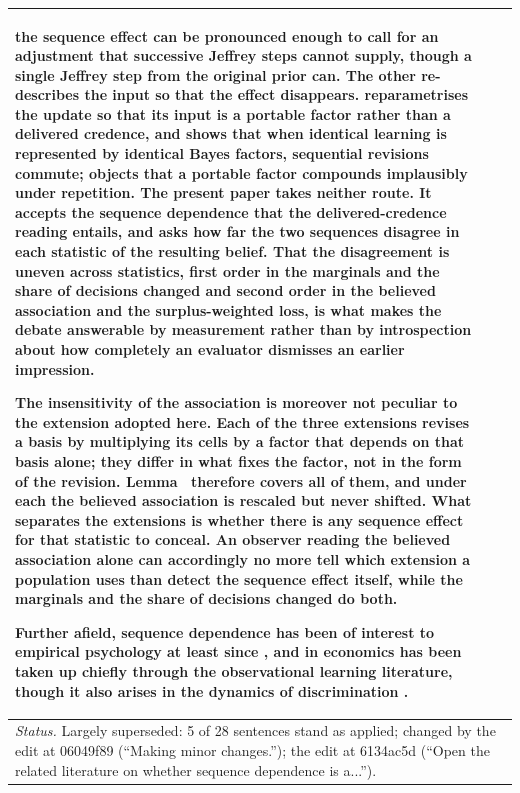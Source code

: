 \documentclass[10pt]{article}
\theoremstyle{definition}
\renewcommand{\ref}[1]{\textsc{\detokenize{#1}}}
\newlength{\fullw}\setlength{\fullw}{25.9cm}
\begin{document}
{\begin{longtable}{|p{0.9cm}|p{12.2cm}|p{12.2cm}|}
the sequence effect can be pronounced enough to call for an adjustment that successive Jeffrey steps cannot supply, though a single Jeffrey step from the original prior can. The other re-describes the input so that the effect disappears. \citet{Field1978} reparametrises the update so that its input is a portable factor rather than a delivered credence, and \citet{Wagner2002} shows that when identical learning is represented by identical Bayes factors, sequential revisions commute; \citet{Garber1980} objects that a portable factor compounds implausibly under repetition. The present paper takes neither route. It accepts the sequence dependence that the delivered-credence reading entails, and asks how far the two sequences disagree in each statistic of the resulting belief. That the disagreement is uneven across statistics, first order in the marginals and the share of decisions changed and second order in the believed association and the surplus-weighted loss, is what makes the debate answerable by measurement rather than by introspection about how completely an evaluator dismisses an earlier impression. \par The insensitivity of the association is moreover not peculiar to the extension adopted here. Each of the three extensions revises a basis by multiplying its cells by a factor that depends on that basis alone; they differ in what fixes the factor, not in the form of the revision. Lemma~\ref{lem:SEP} therefore covers all of them, and under each the believed association is rescaled but never shifted. What separates the extensions is whether there is any sequence effect for that statistic to conceal. An observer reading the believed association alone can accordingly no more tell which extension a population uses than detect the sequence effect itself, while the marginals and the share of decisions changed do both. \par Further afield, sequence dependence has been of interest to empirical psychology at least since \citet{Asch1946}, and in economics has been taken up chiefly through the observational learning literature, though it also arises in the dynamics of discrimination \citep{Bohren2019}. \\ \hline
\multicolumn{3}{|p{\fullw}|}{\textit{Status.} Largely superseded: 5 of 28 sentences stand as applied; changed by the edit at 06049f89 (``Making minor changes.''); the edit at 6134ac5d (``Open the related literature on whether sequence dependence is a...'').} \\ \hline

\end{longtable}}
\end{document}
